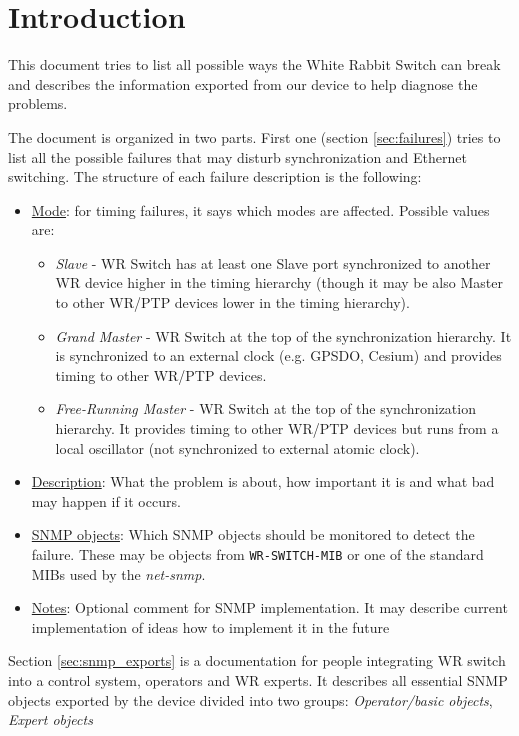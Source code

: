\section{Introduction}

This document tries to list all possible ways the White Rabbit Switch can
break and describes the information exported from our device to help diagnose
the problems.

The document is organized in two parts. First one (section \ref{sec:failures})
tries to list all the possible failures that may disturb synchronization and
Ethernet switching. The structure of each failure description is the following:
\begin{itemize}[leftmargin=0pt]
	\item [] \underline{Mode}: for timing failures, it says which modes are
		affected. Possible values are:
		\begin{itemize}
			\item \emph{Slave} - WR Switch has at least one Slave port synchronized to
				another WR device higher in the timing hierarchy (though it may be also
				Master to other WR/PTP devices lower in the timing hierarchy).
			\item \emph{Grand Master} - WR Switch at the top of the synchronization
				hierarchy. It is synchronized to an external clock (e.g. GPSDO, Cesium)
				and provides timing to other WR/PTP devices.
			\item \emph{Free-Running Master} - WR Switch at the top of the
				synchronization hierarchy. It provides timing to other WR/PTP devices
				but runs from a local oscillator (not synchronized to external atomic
				clock).
		\end{itemize}

	\item [] \underline{Description}: What the problem is about, how important it
		is and what bad may happen if it occurs.
	\item [] \underline{SNMP objects}: Which SNMP objects should be monitored to
		detect the failure. These may be objects from \texttt{WR-SWITCH-MIB} or one
		of the standard MIBs used by the \emph{net-snmp}.
	\item [] \underline{Notes}: Optional comment for SNMP implementation. It may describe current
		implementation of ideas how to implement it in the future
\end{itemize}

Section \ref{sec:snmp_exports} is a documentation for people integrating WR
switch into a control system, operators and WR experts. It describes all
essential SNMP objects exported by the device divided into two groups:
\emph{Operator/basic objects}, \emph{Expert objects}
